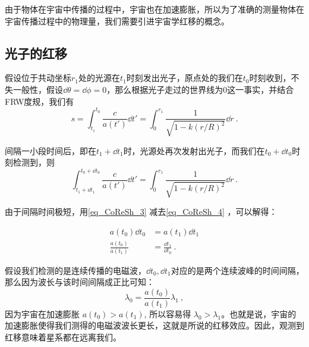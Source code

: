 
\begin{issues}
\issueMissDepend
\end{issues}

由于物体在宇宙中传播的过程中，宇宙也在加速膨胀，所以为了准确的测量物体在宇宙传播过程中的物理量，我们需要引进宇宙学红移的概念。

\subsection{光子的红移}
假设位于共动坐标$r_1$处的光源在$t_1$时刻发出光子，原点处的我们在$t_0$时刻收到，不失一般性，假设$\dd\theta=\dd\phi=0$，那么根据光子走过的世界线为$0$这一事实，并结合FRW度规，我们有
\begin{equation}\label{eq_CoReSh_4}
s=\int^{t_0}_{t_1}\frac{c}{a(t')}\dd t'=\int_0^{r_1}\frac{1}{\sqrt{1-k(r/R)^2}}\dd r~.
\end{equation}

间隔一小段时间后，即在$t_1+\dd t_1$时，光源处再次发射出光子，而我们在$t_0+\dd t_0$时刻检测到，则
\begin{equation}\label{eq_CoReSh_3}
\int^{t_0+\dd t_0}_{t_1+\dd t_1}\frac{c}{a(t')}\dd t'=\int_0^{r_1}\frac{1}{\sqrt{1-k(r/R)^2}}\dd r~.
\end{equation}

由于间隔时间极短，用\autoref{eq_CoReSh_3} 减去\autoref{eq_CoReSh_4} ，可以解得：

\begin{equation}
\begin{aligned}
a(t_0)\dd t_0&=a(t_1)\dd t_1\\
\frac{a(t_0)}{a(t_1)}&=\frac{\dd t_1}{\dd t_0}~.
\end{aligned}
\end{equation}

假设我们检测的是连续传播的电磁波，$\dd t_0,\dd t_1$对应的是两个连续波峰的时间间隔，那么因为波长与该时间间隔成正比可知：
\begin{equation}\label{eq_CoReSh_1}
\lambda_0=\frac{a(t_0)}{a(t_1)}\lambda_1~,
\end{equation}
因为宇宙在加速膨胀 $a(t_0)>a(t_1)$, 所以容易得 $\lambda_0>\lambda_1$。也就是说，宇宙的加速膨胀使得我们测得的电磁波波长更长，这就是所说的红移效应。因此，观测到红移意味着星系都在远离我们。


